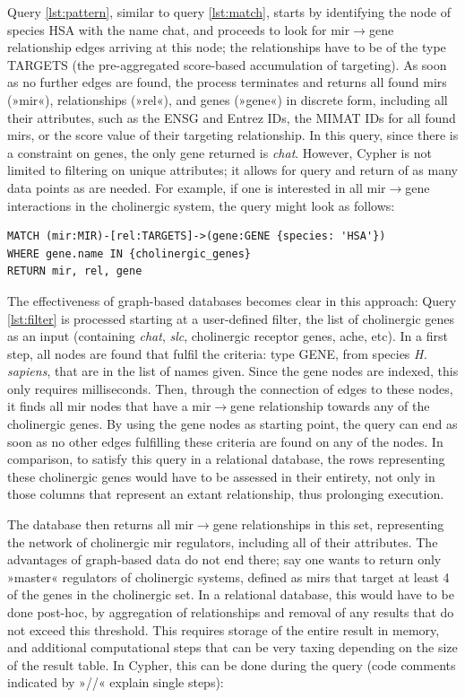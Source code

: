 Query \ref{lst:pattern}, similar to query \ref{lst:match}, starts by identifying the node of species HSA with the name \ac{chat}, and proceeds to look for \ac{mir}$\to$gene relationship edges arriving at this node; the relationships have to be of the type TARGETS (the pre-aggregated score-based accumulation of targeting). As soon as no further edges are found, the process terminates and returns all found \acp{mir} (»mir«), relationships (»rel«), and genes (»gene«) in discrete form, including all their attributes, such as the ENSG and Entrez IDs, the MIMAT IDs for all found \acp{mir}, or the score value of their targeting relationship. In this query, since there is a constraint on genes, the only gene returned is \textit{\ac{chat}}. However, Cypher is not limited to filtering on unique attributes; it allows for query and return of as many data points as are needed. For example, if one is interested in all \ac{mir}$\to$gene interactions in the cholinergic system, the query might look as follows:

\begin{lstlisting}[label=lst:filter,caption=Filtering,
language=Cypher]
MATCH (mir:MIR)-[rel:TARGETS]->(gene:GENE {species: 'HSA'})
WHERE gene.name IN {cholinergic_genes}
RETURN mir, rel, gene
\end{lstlisting}

The effectiveness of graph-based databases becomes clear in this approach: Query \ref{lst:filter} is processed starting at a user-defined filter, the list of cholinergic genes as an input (containing \textit{\ac{chat}}, \textit{\ac{slc}}, cholinergic receptor genes, \acl{ache}, etc). In a first step, all nodes are found that fulfil the criteria: type GENE, from species \textit{H. sapiens}, that are in the list of names given. Since the gene nodes are indexed, this only requires milliseconds. Then, through the connection of edges to these nodes, it finds all \ac{mir} nodes that have a \ac{mir}$\to$gene relationship towards any of the cholinergic genes. By using the gene nodes as starting point, the query can end as soon as no other edges fulfilling these criteria are found on any of the nodes. In comparison, to satisfy this query in a relational database, the rows representing these cholinergic genes would have to be assessed in their entirety, not only in those columns that represent an extant relationship, thus prolonging execution.

The database then returns all \ac{mir}$\to$gene relationships in this set, representing the network of cholinergic \ac{mir} regulators, including all of their attributes. The advantages of graph-based data do not end there; say one wants to return only »master« regulators of cholinergic systems, defined as \acp{mir} that target at least 4 of the genes in the cholinergic set. In a relational database, this would have to be done post-hoc, by aggregation of relationships and removal of any results that do not exceed this threshold. This requires storage of the entire result in memory, and additional computational steps that can be very taxing depending on the size of the result table. In Cypher, this can be done during the query (code comments indicated by »\textcolor{dkgreen}{//}« explain single steps):

